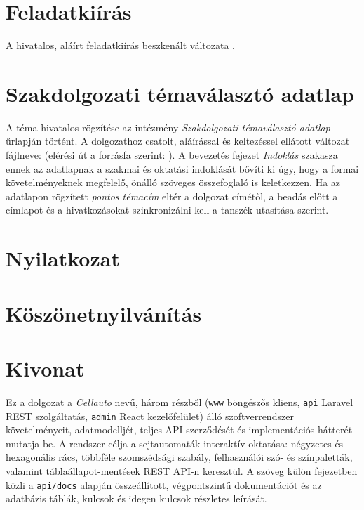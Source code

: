\frontmatter
\maketitle

\chapter*{Feladatkiírás}
A hivatalos, aláírt feladatkiírás beszkenált változata .

\chapter*{Szakdolgozati témaválasztó adatlap}
A téma hivatalos rögzítése az intézmény \emph{Szakdolgozati témaválasztó adatlap} űrlapján történt. A dolgozathoz csatolt, aláírással és keltezéssel ellátott változat fájlneve: \textbf{\TemaValasztoPdf} (elérési út a forrásfa szerint: \texttt{\TemaValasztoUt}). A bevezetés fejezet \emph{Indoklás} szakasza ennek az adatlapnak a szakmai és oktatási indoklását bővíti ki úgy, hogy a formai követelményeknek megfelelő, önálló szöveges összefoglaló is keletkezzen. Ha az adatlapon rögzített \emph{pontos témacím} eltér a dolgozat címétől, a beadás előtt a címlapot és a hivatkozásokat szinkronizálni kell a tanszék utasítása szerint.

\chapter*{Nyilatkozat}

\chapter*{Köszönetnyilvánítás}

\chapter*{Kivonat}
Ez a dolgozat a \emph{Cellauto} nevű, három részből (\texttt{www} böngészős kliens, \texttt{api} Laravel REST szolgáltatás, \texttt{admin} React kezelőfelület) álló szoftverrendszer követelményeit, adatmodelljét, teljes API-szerződését és implementációs hátterét mutatja be. A rendszer célja a sejtautomaták interaktív oktatása: négyzetes és hexagonális rács, többféle szomszédsági szabály, felhasználói szó- és színpaletták, valamint táblaállapot-mentések REST API-n keresztül. A szöveg külön fejezetben közli a \texttt{api/docs} alapján összeállított, végpontszintű dokumentációt és az adatbázis táblák, kulcsok és idegen kulcsok részletes leírását.


